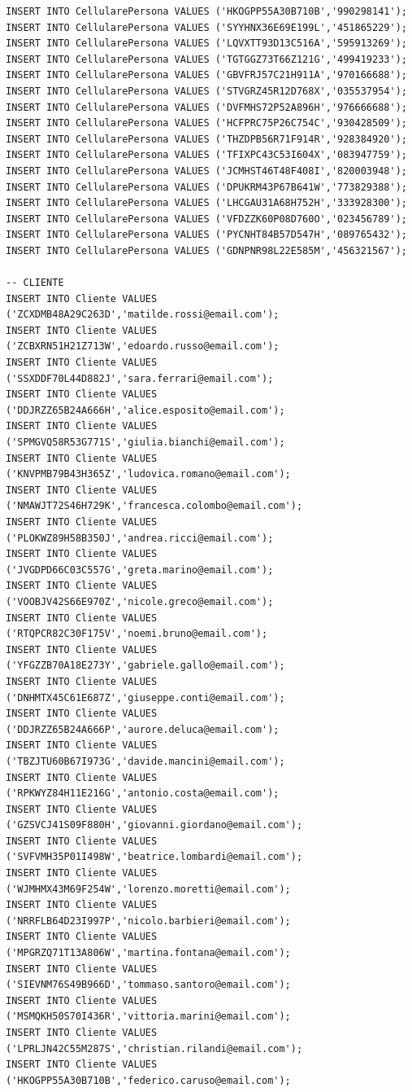 \documentclass[12pt]{report}
\begin{document}
\begin{scriptsize}
\begin{verbatim}
INSERT INTO CellularePersona VALUES ('HKOGPP55A30B710B','990298141');
INSERT INTO CellularePersona VALUES ('SYYHNX36E69E199L','451865229');
INSERT INTO CellularePersona VALUES ('LQVXTT93D13C516A','595913269');
INSERT INTO CellularePersona VALUES ('TGTGGZ73T66Z121G','499419233');
INSERT INTO CellularePersona VALUES ('GBVFRJ57C21H911A','970166688');
INSERT INTO CellularePersona VALUES ('STVGRZ45R12D768X','035537954');
INSERT INTO CellularePersona VALUES ('DVFMHS72P52A896H','976666688');
INSERT INTO CellularePersona VALUES ('HCFPRC75P26C754C','930428509');
INSERT INTO CellularePersona VALUES ('THZDPB56R71F914R','928384920');
INSERT INTO CellularePersona VALUES ('TFIXPC43C53I604X','083947759');
INSERT INTO CellularePersona VALUES ('JCMHST46T48F408I','820003948');
INSERT INTO CellularePersona VALUES ('DPUKRM43P67B641W','773829388');
INSERT INTO CellularePersona VALUES ('LHCGAU31A68H752H','333928300');
INSERT INTO CellularePersona VALUES ('VFDZZK60P08D760O','023456789');
INSERT INTO CellularePersona VALUES ('PYCNHT84B57D547H','089765432');
INSERT INTO CellularePersona VALUES ('GDNPNR98L22E585M','456321567');

-- CLIENTE
INSERT INTO Cliente VALUES ('ZCXDMB48A29C263D','matilde.rossi@email.com');
INSERT INTO Cliente VALUES ('ZCBXRN51H21Z713W','edoardo.russo@email.com');
INSERT INTO Cliente VALUES ('SSXDDF70L44D882J','sara.ferrari@email.com');
INSERT INTO Cliente VALUES ('DDJRZZ65B24A666H','alice.esposito@email.com');
INSERT INTO Cliente VALUES ('SPMGVQ58R53G771S','giulia.bianchi@email.com');
INSERT INTO Cliente VALUES ('KNVPMB79B43H365Z','ludovica.romano@email.com');
INSERT INTO Cliente VALUES ('NMAWJT72S46H729K','francesca.colombo@email.com');
INSERT INTO Cliente VALUES ('PLOKWZ89H58B350J','andrea.ricci@email.com');
INSERT INTO Cliente VALUES ('JVGDPD66C03C557G','greta.marino@email.com');
INSERT INTO Cliente VALUES ('VOOBJV42S66E970Z','nicole.greco@email.com');
INSERT INTO Cliente VALUES ('RTQPCR82C30F175V','noemi.bruno@email.com');
INSERT INTO Cliente VALUES ('YFGZZB70A18E273Y','gabriele.gallo@email.com');
INSERT INTO Cliente VALUES ('DNHMTX45C61E687Z','giuseppe.conti@email.com');
INSERT INTO Cliente VALUES ('DDJRZZ65B24A666P','aurore.deluca@email.com');
INSERT INTO Cliente VALUES ('TBZJTU60B67I973G','davide.mancini@email.com');
INSERT INTO Cliente VALUES ('RPKWYZ84H11E216G','antonio.costa@email.com');
INSERT INTO Cliente VALUES ('GZSVCJ41S09F880H','giovanni.giordano@email.com');
INSERT INTO Cliente VALUES ('SVFVMH35P01I498W','beatrice.lombardi@email.com');
INSERT INTO Cliente VALUES ('WJMHMX43M69F254W','lorenzo.moretti@email.com');
INSERT INTO Cliente VALUES ('NRRFLB64D23I997P','nicolo.barbieri@email.com');
INSERT INTO Cliente VALUES ('MPGRZQ71T13A806W','martina.fontana@email.com');
INSERT INTO Cliente VALUES ('SIEVNM76S49B966D','tommaso.santoro@email.com');
INSERT INTO Cliente VALUES ('MSMQKH50S70I436R','vittoria.marini@email.com');
INSERT INTO Cliente VALUES ('LPRLJN42C55M287S','christian.rilandi@email.com');
INSERT INTO Cliente VALUES ('HKOGPP55A30B710B','federico.caruso@email.com');


\end{verbatim}
\end{scriptsize}
\end{document}
